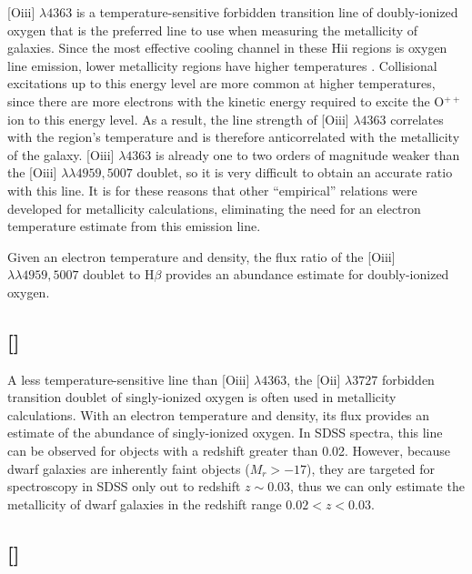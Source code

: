 [O{\sc iii}] $\lambda 4363$ is a temperature-sensitive forbidden transition line 
of doubly-ionized oxygen that is the preferred line to use when measuring the 
metallicity of galaxies.  Since the most effective cooling channel in these 
H{\sc ii} regions is oxygen line emission, lower metallicity regions have higher 
temperatures  \citep{Saintonge07}.  Collisional excitations up to this energy 
level are more common at higher temperatures, since there are more electrons 
with the kinetic energy required to excite the O$^{++}$ ion to this energy 
level.  As a result, the line strength of [O{\sc iii}] $\lambda 4363$ correlates 
with the region's temperature and is therefore anticorrelated with the 
metallicity of the galaxy.  [O{\sc iii}] $\lambda 4363$ is already one to two 
orders of magnitude weaker than the [O{\sc iii}] $\lambda \lambda 4959, 5007$ 
doublet, so it is very difficult to obtain an accurate ratio with this line.  It 
is for these reasons that other ``empirical'' relations were developed for 
metallicity calculations, eliminating the need for an electron temperature 
estimate from this emission line.

Given an electron temperature and density, the flux ratio of the [O{\sc iii}] 
$\lambda \lambda 4959, 5007$ doublet to H$\beta$ provides an abundance estimate 
for doubly-ionized oxygen.



\subsection{[]}

A less temperature-sensitive line than [O{\sc iii}] $\lambda 4363$, the 
[O{\sc ii}] $\lambda 3727$ forbidden transition doublet of singly-ionized 
oxygen is often used in metallicity calculations.  With an electron temperature 
and density, its flux provides an estimate of the abundance of singly-ionized 
oxygen.  In SDSS spectra, this line can be observed for objects with a redshift 
greater than 0.02.  However, because dwarf galaxies are inherently faint objects 
($M_r > -17$), they are targeted for spectroscopy in SDSS only out to redshift 
$z\sim 0.03$, thus we can only estimate the metallicity of dwarf galaxies in the 
redshift range $0.02 < z < 0.03$.



\subsection{[]}

